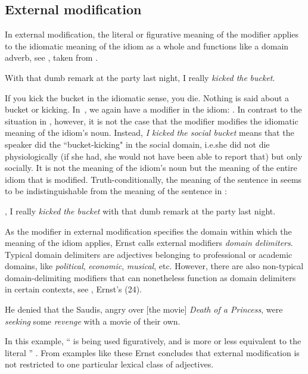 \documentclass[output=paper]{langsci/langscibook}
\begin{document}
\subsection{External modification} \label{ExtMod}

In external modification, the literal or figurative meaning of the modifier applies to the idiomatic meaning of the idiom as a whole and functions like a domain adverb, see , taken from \citet[51]{ernst81}.

\ea \label{social bucket}
With that dumb remark at the party last night, I really \textit{kicked the} \underline{} \textit{bucket}.
\z

\noindent If you kick the bucket in the idiomatic sense, you die. Nothing is said about a bucket or kicking. \mbox{In }, we again have a modifier in the idiom: \underline{}. In contrast to the situation in , however, it is not the case that the modifier modifies the idiomatic meaning of the idiom's noun. Instead, \textit{I kicked the social bucket} means that the speaker did the ``bucket-kicking" in the social domain, i.e.\@ she did not die physiologically (if she had, she would not have been able to report that) but only socially. It is not the meaning of the idiom's noun but the meaning of the entire idiom that is modified. Truth-conditionally, the meaning of the sentence in  seems to be indistinguishable from the meaning of the sentence in :

\ea \label{socially ktb}
\underline{}, I really \textit{kicked the bucket} with that dumb remark at the party last night.
\z

\noindent As the modifier in external modification specifies the domain within which the meaning of the idiom applies, Ernst calls external modifiers \textit{domain delimiters}. Typical domain delimiters are adjectives belonging to professional or academic domains, like \textit{political}, \textit{economic}, \textit{musical}, etc. However, there are also non-typical domain-delimiting modifiers that can nonetheless function as domain delimiters in certain contexts, see , Ernst's (24).

\ea \label{celluloid revenge}
He denied that the Saudis, angry over [the movie] \textit{Death of a Princess}, were \textit{seeking} some \underline{} \textit{revenge} with a movie of their own.
\z

\noindent In this example, ``\underline{} is being used figuratively, and is more or less equivalent to the literal \underline{}'' \citep[55]{ernst81}. From examples like these Ernst concludes that external modification is not restricted to one particular lexical class of adjectives.
\end{document}
